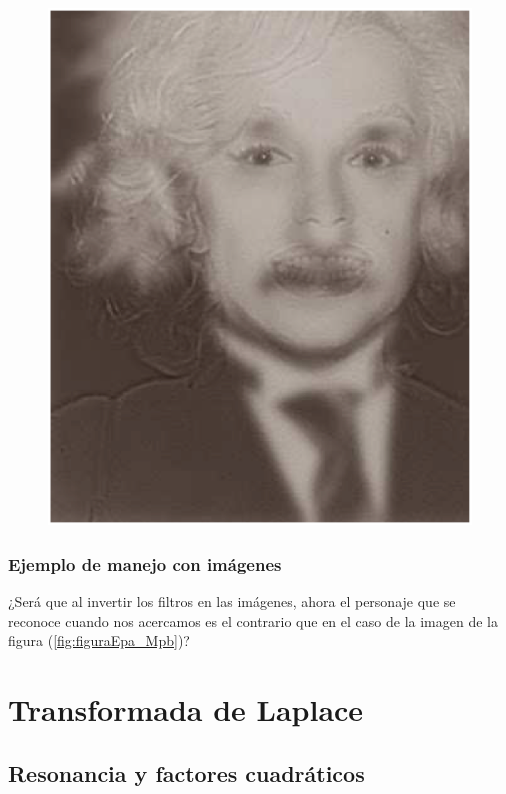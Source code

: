 \begin{frame}[plain]
\begin{figure}[H]
    \centering
    \includegraphics[scale=0.3]{Imagenes/Einstein_Marylin_BA_01.eps}
\end{figure}
\end{frame}
\begin{frame}
\frametitle{Ejemplo de manejo con imágenes}
¿Será que al invertir los filtros en las imágenes, ahora el personaje que se reconoce cuando nos acercamos es el contrario que en el caso de la imagen de la figura (\ref{fig:figuraEpa_Mpb})?
\end{frame}

\section{Transformada de Laplace}
\subsection{Resonancia y factores cuadráticos}

